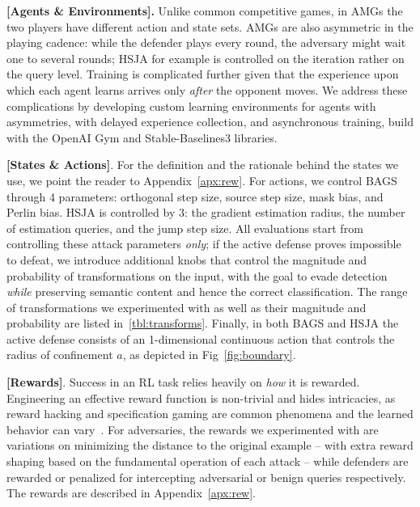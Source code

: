\textbf{[Agents \& Environments].} Unlike common competitive games, in AMGs the two players have different action and state sets.
AMGs are also asymmetric in the playing cadence: while the defender plays every round, the adversary might wait one to several rounds; HSJA for example is controlled on the iteration rather on the query level.
Training is complicated further given that the experience upon which each agent learns arrives only \emph{after} the opponent moves.
We address these complications by developing custom learning environments for agents with asymmetries, with delayed experience collection, and asynchronous training, build with the OpenAI Gym and Stable-Baselines3 libraries.

\textbf{[States \& Actions]}. 
For the definition and the rationale behind the states we use, we point the reader to Appendix~\ref{apx:rew}.
For actions, we control BAGS through 4 parameters: orthogonal step size, source step size, mask bias, and Perlin bias.
HSJA is controlled by 3: the gradient estimation radius, the number of estimation queries, and the jump step size.
All evaluations start from controlling these attack parameters \textit{only}; if the active defense proves impossible to defeat, we introduce additional knobs that control the magnitude and probability of transformations on the input, with the goal to evade detection \emph{while} preserving semantic content and hence the correct classification.
The range of transformations we experimented with as well as their magnitude and probability are listed in~\autoref{tbl:transforms}.
Finally, in both BAGS and HSJA the active defense consists of an 1-dimensional continuous action that controls the radius of confinement $a$, as depicted in Fig~\ref{fig:boundary}.

\textbf{[Rewards]}. Success in an \gls{RL} task relies heavily on \emph{how} it is rewarded.
Engineering an effective reward function is non-trivial and hides intricacies, as reward hacking and specification gaming are common phenomena and the learned behavior can vary~\cite{amodei2016concrete}.
For adversaries, the rewards we experimented with are variations on minimizing the distance to the original example -- with extra reward shaping based on the fundamental operation of each attack -- while defenders are rewarded or penalized for intercepting adversarial or benign queries respectively.
The rewards are described in Appendix~\ref{apx:rew}.

